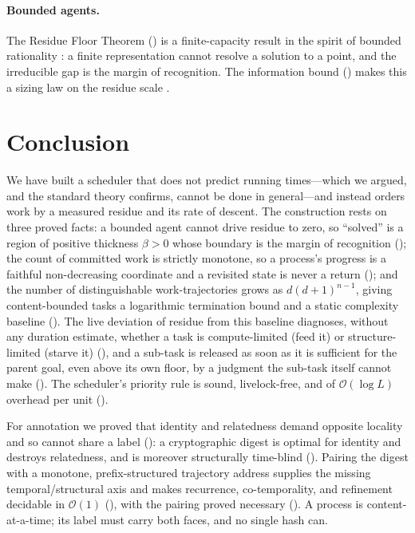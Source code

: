 \documentclass[twocolumn,10pt,a4paper]{article}
\theoremstyle{thmstyle}
\theoremstyle{definition}
\theoremstyle{remark}
\newcommand{\floor}{\beta}
\begin{document}
\paragraph{Bounded agents.} The Residue Floor Theorem
() is a finite-capacity result in the spirit of bounded
rationality \citep{simon1955}: a finite representation cannot resolve a
solution to a point, and the irreducible gap is the margin of
recognition. The information bound () makes this a sizing
law on the residue scale \citep{shannon1948,cover2006}.

\section{Conclusion}
\label{sec:conclusion}

We have built a scheduler that does not predict running times---which we
argued, and the standard theory confirms, cannot be done in
general---and instead orders work by a measured residue and its rate of
descent. The construction rests on three proved facts: a bounded agent
cannot drive residue to zero, so ``solved'' is a region of positive
thickness $\floor>0$ whose boundary is the margin of recognition
(); the count of committed work is strictly monotone, so a
process's progress is a faithful non-decreasing coordinate and a revisited
state is never a return (); and the number of
distinguishable work-trajectories grows as $d(d+1)^{n-1}$, giving
content-bounded tasks a logarithmic termination bound and a static
complexity baseline (). The live
deviation of residue from this baseline diagnoses, without any duration
estimate, whether a task is compute-limited (feed it) or structure-limited
(starve it) (), and a sub-task is released as soon as
it is sufficient for the parent goal, even above its own floor, by a
judgment the sub-task itself cannot make
(). The scheduler's priority rule is
sound, livelock-free, and of $\mathcal{O}(\log L)$ overhead per unit
().

For annotation we proved that identity and relatedness demand opposite
locality and so cannot share a label (): a
cryptographic digest is optimal for identity and destroys relatedness, and
is moreover structurally time-blind (). Pairing the
digest with a monotone, prefix-structured trajectory address supplies the
missing temporal/structural axis and makes recurrence, co-temporality, and
refinement decidable in $\mathcal{O}(1)$ (), with the
pairing proved necessary (). A process is
content-at-a-time; its label must carry both faces, and no single hash can.
\end{document}

